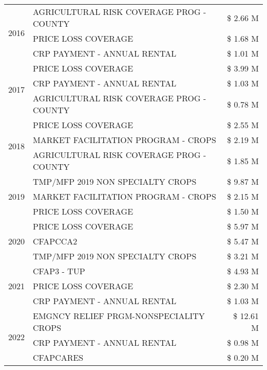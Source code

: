\begin{tabular}{llr}
\cline{1-3}
\multirow[t]{3}{*}{2016} & AGRICULTURAL RISK COVERAGE PROG - COUNTY & \$ 2.66 M \\
 & PRICE LOSS COVERAGE & \$ 1.68 M \\
 & CRP PAYMENT - ANNUAL RENTAL & \$ 1.01 M \\
\cline{1-3}
\multirow[t]{3}{*}{2017} & PRICE LOSS COVERAGE & \$ 3.99 M \\
 & CRP PAYMENT - ANNUAL RENTAL & \$ 1.03 M \\
 & AGRICULTURAL RISK COVERAGE PROG - COUNTY & \$ 0.78 M \\
\cline{1-3}
\multirow[t]{3}{*}{2018} & PRICE LOSS COVERAGE & \$ 2.55 M \\
 & MARKET FACILITATION PROGRAM - CROPS & \$ 2.19 M \\
 & AGRICULTURAL RISK COVERAGE PROG - COUNTY & \$ 1.85 M \\
\cline{1-3}
\multirow[t]{3}{*}{2019} & TMP/MFP 2019 NON SPECIALTY CROPS & \$ 9.87 M \\
 & MARKET FACILITATION PROGRAM - CROPS & \$ 2.15 M \\
 & PRICE LOSS COVERAGE & \$ 1.50 M \\
\cline{1-3}
\multirow[t]{3}{*}{2020} & PRICE LOSS COVERAGE & \$ 5.97 M \\
 & CFAPCCA2 & \$ 5.47 M \\
 & TMP/MFP 2019 NON SPECIALTY CROPS & \$ 3.21 M \\
\cline{1-3}
\multirow[t]{3}{*}{2021} & CFAP3 - TUP & \$ 4.93 M \\
 & PRICE LOSS COVERAGE & \$ 2.30 M \\
 & CRP PAYMENT - ANNUAL RENTAL & \$ 1.03 M \\
\cline{1-3}
\multirow[t]{3}{*}{2022} & EMGNCY RELIEF PRGM-NONSPECIALITY CROPS & \$ 12.61 M \\
 & CRP PAYMENT - ANNUAL RENTAL & \$ 0.98 M \\
 & CFAPCARES & \$ 0.20 M \\
\cline{1-3}
\bottomrule
\end{tabular}
